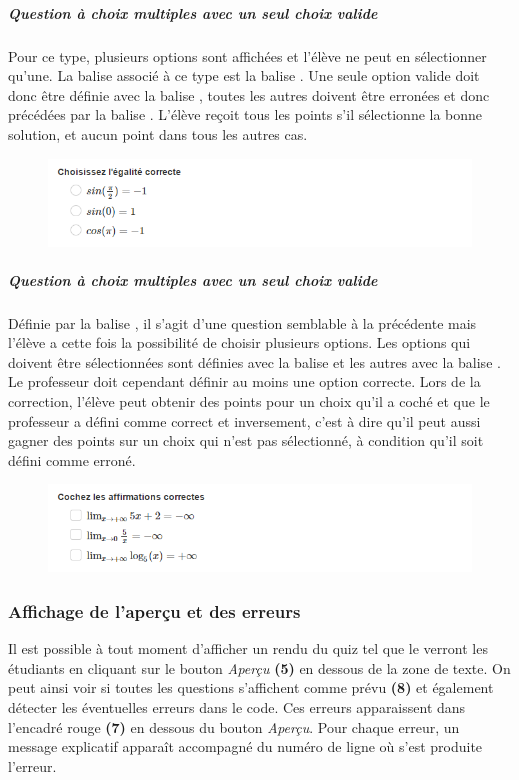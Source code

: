 \documentclass[a4,10pt,french]{sphinxmanual}
\begin{document}
\subparagraph{Question à choix multiples avec un seul choix valide}
\label{doc-user:question-a-choix-multiples-avec-un-seul-choix-valide}
Pour ce type, plusieurs options sont affichées et l'élève ne peut en sélectionner qu'une. La balise associé à ce type est la balise \code{**}. Une seule option valide doit donc être définie avec la balise \code{=}, toutes les autres doivent être erronées et donc précédées par la balise \code{*}. L'élève reçoit tous les points s'il sélectionne la bonne solution, et aucun point dans tous les autres cas.
\begin{figure}[htbp]
\centering

\includegraphics{radio.png}
\end{figure}


\subparagraph{Question à choix multiples avec un seul choix valide}
\label{doc-user:id1}
Définie par la balise \code{\#\#}, il s'agit d'une question semblable à la précédente mais l'élève a cette fois la possibilité de choisir plusieurs options. Les options qui doivent être sélectionnées sont définies avec la balise \code{=} et les autres avec la balise \code{*}. Le professeur doit cependant définir au moins une option correcte. Lors de la correction, l'élève peut obtenir des points pour un choix qu'il a coché et que le professeur a défini comme correct et inversement, c'est à dire qu'il peut aussi gagner des points sur un choix qui n'est pas sélectionné, à condition qu'il soit défini comme erroné.
\begin{figure}[htbp]
\centering

\includegraphics{checkbox.png}
\end{figure}


\subsubsection{Affichage de l'aperçu et des erreurs}
\label{doc-user:affichage-de-l-apercu-et-des-erreurs}
Il est possible à tout moment d'afficher un rendu du quiz tel que le verront les étudiants en cliquant sur le bouton \emph{Aperçu} \textbf{(5)} en dessous de la zone de texte. On peut ainsi voir si toutes les questions s'affichent comme prévu \textbf{(8)} et également détecter les éventuelles erreurs dans le code. Ces erreurs apparaissent dans l'encadré rouge \textbf{(7)} en dessous du bouton \emph{Aperçu}. Pour chaque erreur, un message explicatif apparaît accompagné du numéro de ligne où s'est produite l'erreur.
\end{document}

